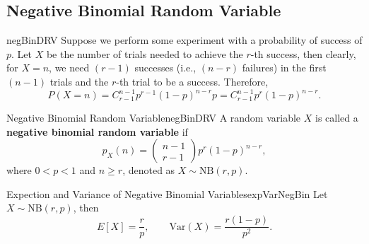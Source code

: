 \documentclass[math]{amznotes}
\theoremstyle{remark}
\begin{document}
\subsection{Negative Binomial Random Variable}{negBinDRV}
Suppose we perform some experiment with a probability of success of $p$. Let $X$ be the number of trials needed to achieve the $r$-th success, then clearly, for $X = n$, we need $(r - 1)$ successes (i.e., $(n - r)$ failures) in the first $(n - 1)$ trials and the $r$-th trial to be a success. Therefore,
\begin{equation*}
    P(X = n) = C^{n - 1}_{r - 1}p^{r - 1}(1 - p)^{n - r}p = C^{n - 1}_{r - 1}p^r(1 - p)^{n - r}.
\end{equation*}
\begin{dfnbox}{Negative Binomial Random Variable}{negBinDRV}
    A random variable $X$ is called a {\color{red} \textbf{negative binomial random variable}} if
    \begin{equation*}
        p_X(n) = \begin{pmatrix}
            n - 1 \\
            r - 1
        \end{pmatrix}p^r(1 - p)^{n - r},
    \end{equation*}
    where $0 < p < 1$ and $n \geq r$, denoted as $X \sim \mathrm{NB}(r, p)$.
\end{dfnbox}
\begin{thmbox}{Expection and Variance of Negative Binomial Variables}{expVarNegBin}
    Let $X \sim \mathrm{NB}(r, p)$, then
    \begin{equation*}
        E[X] = \frac{r}{p}, \qquad \mathrm{Var}(X) = \frac{r(1 - p)}{p^2}.
    \end{equation*}
\end{thmbox}
\end{document}
